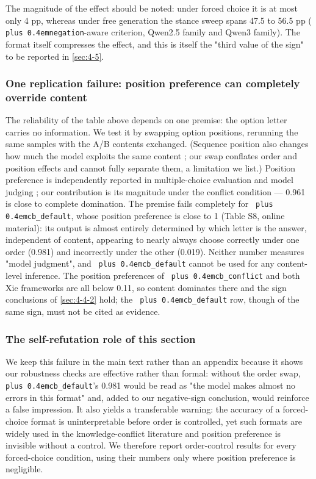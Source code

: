 \documentclass[pdflatex,sn-basic,Numbered]{sn-jnl}
\theoremstyle{thmstyleone}
\theoremstyle{thmstyletwo}
\theoremstyle{thmstylethree}
\DeclareRobustCommand{\code}[1]{\texttt{\spaceskip=0pt plus 0.4em\relax#1}}
\begin{document}
The magnitude of the effect should be noted: under forced choice it is at most only 4 pp, whereas under free generation the stance sweep spans 47.5 to 56.5 pp (\code{negation}-aware criterion, Qwen2.5 family and Qwen3 family).
The format itself compresses the effect, and this is itself the "third value of the sign" to be reported in \ref{sec:4-5}.

\subsubsection{One replication failure: position preference can completely override content}
\label{sec:4-4-3}

The reliability of the table above depends on one premise: the option letter carries no
information. We test it by swapping option positions, rerunning the same samples with the A/B
contents exchanged. (Sequence position also changes how much the model exploits the same
content \cite{ref47}; our swap conflates order and position effects and cannot fully separate them, a
limitation we list.) Position preference is independently reported in multiple-choice evaluation
and model judging \cite{ref35,ref36,ref40}; our contribution is its magnitude under the conflict condition —
0.961 is close to complete domination. The premise fails completely for \code{cb\_default}, whose
position preference is close to 1 (Table S8, online material): its output is almost
entirely determined by which letter is the answer, independent of content, appearing to nearly
always choose correctly under one order (0.981) and incorrectly under the other (0.019).
Neither number measures "model judgment", and \code{cb\_default} cannot be used for any content-level
inference. The position preferences of \code{cb\_conflict} and both Xie frameworks are all below
0.11, so content dominates there and the sign conclusions of \ref{sec:4-4-2} hold; the \code{cb\_default} row,
though of the same sign, must not be cited as evidence.

\subsubsection{The self-refutation role of this section}
\label{sec:4-4-4}

We keep this failure in the main text rather than an appendix because it shows our robustness
checks are effective rather than formal: without the order swap, \code{cb\_default}'s 0.981 would be
read as "the model makes almost no errors in this format" and, added to our negative-sign
conclusion, would reinforce a false impression. It also yields a transferable warning: the
accuracy of a forced-choice format is uninterpretable before order is controlled, yet such
formats are widely used in the knowledge-conflict literature and position preference is
invisible without a control. We therefore report order-control results for every forced-choice
condition, using their numbers only where position preference is negligible.
\end{document}
